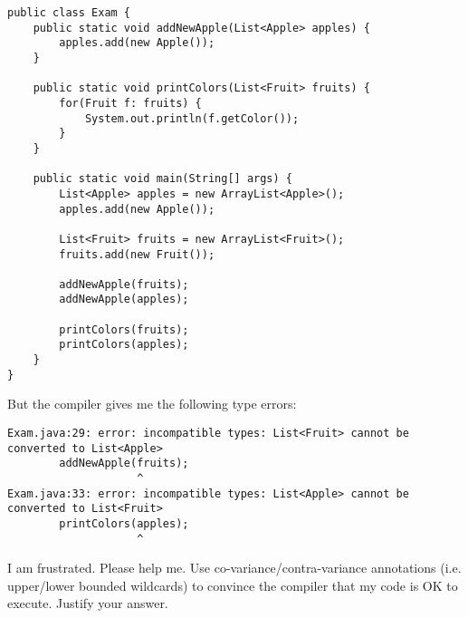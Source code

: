 \documentclass[addpoints]{exam}
\begin{document}
\begin{questions}
{\begin{verbatim}
public class Exam {
    public static void addNewApple(List<Apple> apples) {
        apples.add(new Apple());
    }

    public static void printColors(List<Fruit> fruits) {
        for(Fruit f: fruits) {
            System.out.println(f.getColor());
        }
    }

    public static void main(String[] args) {
        List<Apple> apples = new ArrayList<Apple>();
        apples.add(new Apple());

        List<Fruit> fruits = new ArrayList<Fruit>();
        fruits.add(new Fruit());

        addNewApple(fruits);
        addNewApple(apples);

        printColors(fruits);
        printColors(apples);
    }
}
  \end{verbatim}
  }

  But the compiler gives me the following type errors:

  {\small
\begin{verbatim}
Exam.java:29: error: incompatible types: List<Fruit> cannot be converted to List<Apple>
        addNewApple(fruits);
                    ^
Exam.java:33: error: incompatible types: List<Apple> cannot be converted to List<Fruit>
        printColors(apples);
                    ^
\end{verbatim}
  }
  
  I am frustrated. Please help me.
  Use co-variance/contra-variance annotations
  (i.e. upper/lower bounded wildcards)
  to convince the compiler
  that my code is OK to execute.
  Justify your answer.

\end{questions}
\end{document}
